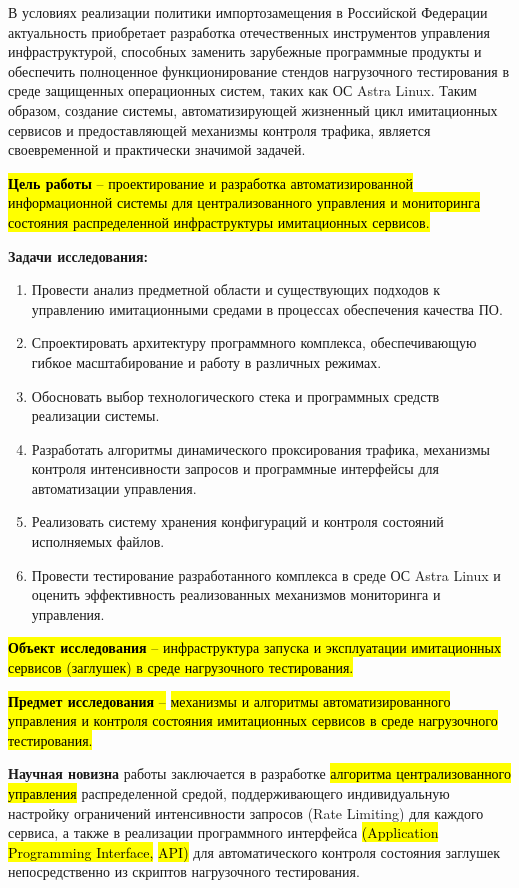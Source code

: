 \documentclass[
]{article}
\begin{document}
В условиях реализации политики импортозамещения в Российской Федерации
актуальность приобретает разработка отечественных инструментов
управления инфраструктурой, способных заменить зарубежные программные
продукты и обеспечить полноценное функционирование стендов нагрузочного
тестирования в среде защищенных операционных систем, таких как ОС Astra
Linux. Таким образом, создание системы, автоматизирующей жизненный цикл
имитационных сервисов и предоставляющей механизмы контроля трафика,
является своевременной и практически значимой задачей.

\hl{\textbf{Цель работы} -- проектирование и разработка
автоматизированной информационной системы для централизованного
управления и мониторинга состояния распределенной инфраструктуры
имитационных сервисов.}

\textbf{Задачи исследования:}

\begin{enumerate}
\def\labelenumi{\arabic{enumi}.}
\item
  Провести анализ предметной области и существующих подходов к
  управлению имитационными средами в процессах обеспечения качества ПО.
\item
  Спроектировать архитектуру программного комплекса, обеспечивающую
  гибкое масштабирование и работу в различных режимах.
\item
  Обосновать выбор технологического стека и программных средств
  реализации системы.
\item
  Разработать алгоритмы динамического проксирования трафика, механизмы
  контроля интенсивности запросов и программные интерфейсы для
  автоматизации управления.
\item
  Реализовать систему хранения конфигураций и контроля состояний
  исполняемых файлов.
\item
  Провести тестирование разработанного комплекса в среде ОС Astra Linux
  и оценить эффективность реализованных механизмов мониторинга и
  управления.
\end{enumerate}

\hl{\textbf{Объект исследования} -- инфраструктура запуска и
эксплуатации имитационных сервисов (заглушек) в среде нагрузочного
тестирования.}

\hl{\textbf{Предмет исследования} --} \hl{механизмы и алгоритмы
автоматизированного управления и контроля состояния имитационных
сервисов в среде нагрузочного тестирования.}

\textbf{Научная новизна} работы заключается в разработке \hl{алгоритма
централизованного управления} распределенной средой, поддерживающего
индивидуальную настройку ограничений интенсивности запросов (Rate
Limiting) для каждого сервиса, а также в реализации программного
интерфейса \hl{(Application Programming Interface,} \hl{API)} для
автоматического контроля состояния заглушек непосредственно из скриптов
нагрузочного тестирования.
\end{document}
